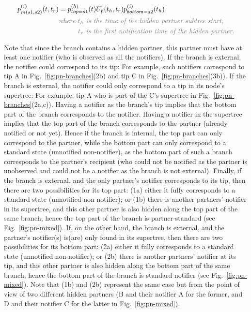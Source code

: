 \documentclass[a4paper,10pt]{article}
\begin{document}
\begin{equation}
\begin{split}
p_{m(s1,s2)}^{(i)}(t,t_r) &= p_{top=s1}^{(h)}(t)U_p(t_h,t_r)p_{bottom=s2}^{(i)}(t_h)\textit{\color{gray},}\\
&\textit{\color{gray}where $t_h$ is the time of the hidden partner subtree start,}\\
&\textit{\color{gray}~~~~~~~~$t_r$ is the first notification time of the hidden partner.}\\
\end{split}
\end{equation}\label{eq:mixed}


Note that since the branch contains a hidden partner, this partner must have at least one notifier (who is observed as all the notifiers). If the branch is external, the notifier could correspond to its tip: For example, such notifiers correspond to tip A in Fig.~\ref{fig:pn-branches}(2b) and tip C in Fig.~\ref{fig:pn-branches}(3b)). If the branch is external, the notifier could only correspond to a tip in its node's supertree: For example, tip A who is part of the C's supertree in Fig.~\ref{fig:pn-branches}(2a,c)). 
Having a notifier as the branch's tip implies that the bottom part of the branch corresponds to the notifier. Having a notifier in the supertree implies that the top part of the branch corresponds to the partner (already notified or not yet). Hence if the branch is internal, the top part can only correspond to the partner, while the bottom part can only correspond to a standard state (unnotified non-notifier), as the bottom part of such a branch corresponds to the partner's recipient (who could not be notified as the partner is unobserved and could not be a notifier as the branch is not external). Finally, if the branch is external, and the only partner's notifier corresponds to its tip, then there are two possibilities for its top part: (1a) either it fully corresponds to a standard state (unnotified non-notifier); or (1b) there is another partners' notifier in its supertree, and this other partner is also hidden along the top part of the same branch, hence the top part of the branch is partner-standard (see Fig.~\ref{fig:pn-mixed}). If, on the other hand, the branch is external, and the partner's notifier(s) is(are) only found in its supertree, then there are two possibilities for its bottom part: (2a) either it fully corresponds to a standard state (unnotified non-notifier); or (2b) there is another partners' notifier at its tip, and this other partner is also hidden along the bottom part of the same branch, hence the bottom part of the branch is standard-notifier (see Fig.~\ref{fig:pn-mixed}). Note that (1b) and (2b) represent the same case but from the point of view of two different hidden partners (B and their notifier A for the former, and D and their notifier C for the latter in Fig.~\ref{fig:pn-mixed}).  
\end{document}
